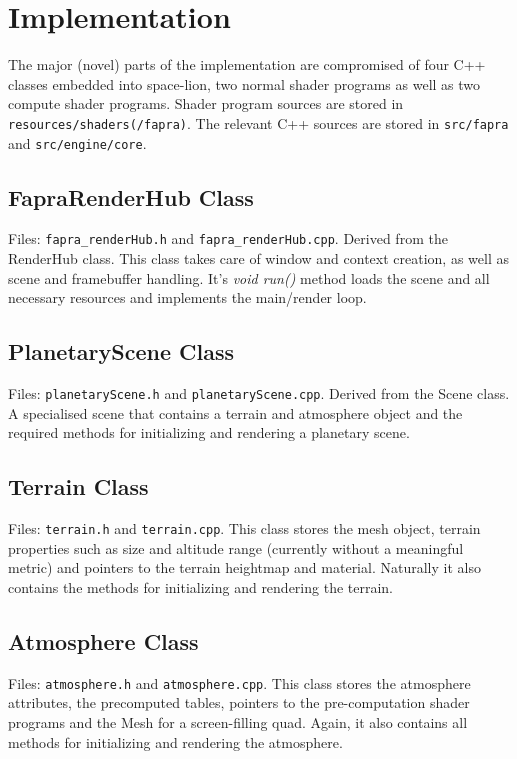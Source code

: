 \documentclass[12pt]{article}
\begin{document}
\section*{Implementation}
The major (novel) parts of the implementation are compromised of four C++ classes embedded into space-lion, two normal shader programs as well as two compute shader programs.\newline
Shader program sources are stored in \texttt{resources/shaders(/fapra)}.\newline
The relevant C++ sources are stored in \texttt{src/fapra} and \texttt{src/engine/core}.
\subsection*{FapraRenderHub Class}
Files: \texttt{fapra\_renderHub.h} and \texttt{fapra\_renderHub.cpp}.\newline
Derived from the RenderHub class. This class takes care of window and context creation, as well as scene and framebuffer handling. It's \textit{void run()} method loads the scene and all necessary resources and implements the main/render loop.
\subsection*{PlanetaryScene Class}
Files: \texttt{planetaryScene.h} and \texttt{planetaryScene.cpp}.\newline
Derived from the Scene class. A specialised scene that contains a terrain and atmosphere object and the required methods for initializing and rendering a planetary scene.
\subsection*{Terrain Class}
Files: \texttt{terrain.h} and \texttt{terrain.cpp}.\newline
This class stores the mesh object, terrain properties such as size and altitude range (currently without a meaningful metric) and pointers to the terrain heightmap and material. Naturally it also contains the methods for initializing and rendering the terrain.
\subsection*{Atmosphere Class}
Files: \texttt{atmosphere.h} and \texttt{atmosphere.cpp}.\newline
This class stores the atmosphere attributes, the precomputed tables, pointers to the pre-computation shader programs and the Mesh for a screen-filling quad. Again, it also contains all methods for initializing and rendering the atmosphere.
\end{document}
